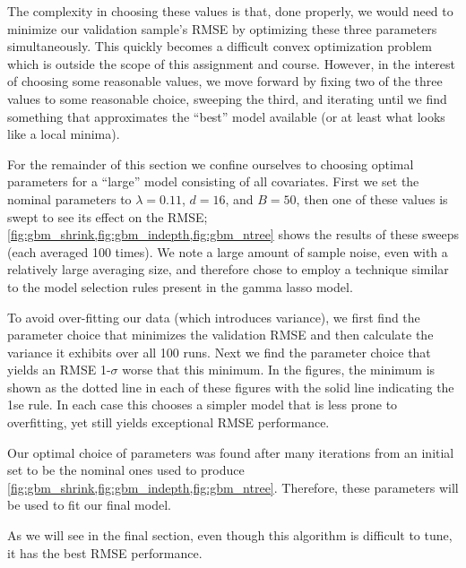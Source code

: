 \documentclass[11pt, fleqn]{article}
\begin{document}
The complexity in choosing these values is that, done properly, we would need to minimize our validation sample's RMSE by optimizing these three parameters simultaneously.  This quickly becomes a difficult convex optimization problem which is outside the scope of this assignment and course.  However, in the interest of choosing some reasonable values, we move forward by fixing two of the three values to some reasonable choice, sweeping the third, and iterating until we find something that approximates the ``best'' model available (or at least what looks like a local minima).

For the remainder of this section we confine ourselves to choosing optimal parameters for a ``large'' model consisting of all covariates.  First we set the nominal parameters to $\lambda=0.11$, $d=16$, and $B=50$, then one of these values is swept to see its effect on the RMSE; \cref{fig:gbm_shrink,fig:gbm_indepth,fig:gbm_ntree} shows the results of these sweeps (each averaged 100 times).  We note a large amount of sample noise, even with a relatively large averaging size, and therefore chose to employ a technique similar to the model selection rules present in the gamma lasso model.

To avoid over-fitting our data (which introduces variance), we first find the parameter choice that minimizes the validation RMSE and then calculate the variance it exhibits over all 100 runs.  Next we find the parameter choice that yields an RMSE 1-$\sigma$ worse that this minimum.  In the figures, the minimum is shown as the dotted line in each of these figures with the solid line indicating the 1se rule.  In each case this chooses a simpler model that is less prone to overfitting, yet still yields exceptional RMSE performance.

Our optimal choice of parameters was found after many iterations from an initial set to be the nominal ones used to produce \cref{fig:gbm_shrink,fig:gbm_indepth,fig:gbm_ntree}.  Therefore, these parameters will be used to fit our final model.

As we will see in the final section, even though this algorithm is difficult to tune, it has the best RMSE performance.

\end{document}
